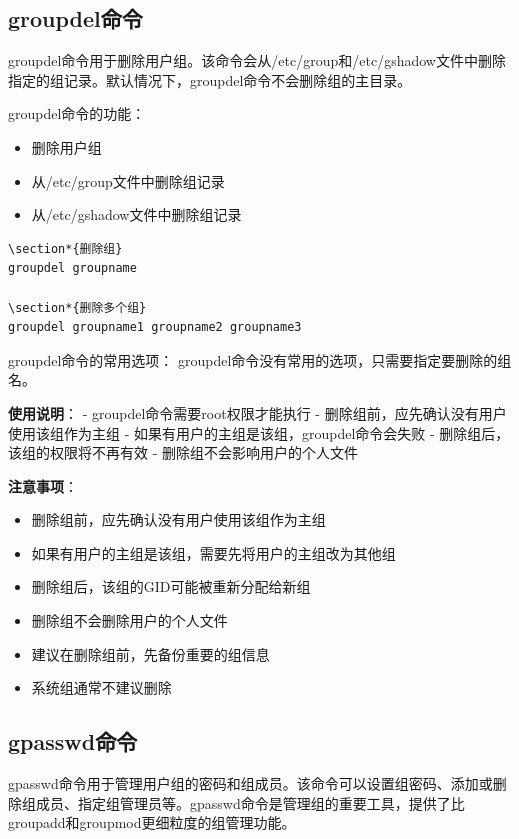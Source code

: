 \documentclass[12pt,UTF8]{ctexbook}
\begin{document}
\subsection{groupdel命令}
groupdel命令用于删除用户组。该命令会从/etc/group和/etc/gshadow文件中删除指定的组记录。默认情况下，groupdel命令不会删除组的主目录。

groupdel命令的功能：
\begin{itemize}
    \item 删除用户组
    \item 从/etc/group文件中删除组记录
    \item 从/etc/gshadow文件中删除组记录
\end{itemize}

\begin{verbatim}
\section*{删除组}
groupdel groupname

\section*{删除多个组}
groupdel groupname1 groupname2 groupname3
\end{verbatim}

groupdel命令的常用选项：
groupdel命令没有常用的选项，只需要指定要删除的组名。

\textbf{使用说明}：
- groupdel命令需要root权限才能执行
- 删除组前，应先确认没有用户使用该组作为主组
- 如果有用户的主组是该组，groupdel命令会失败
- 删除组后，该组的权限将不再有效
- 删除组不会影响用户的个人文件

\textbf{注意事项}：
\begin{itemize}
    \item 删除组前，应先确认没有用户使用该组作为主组
    \item 如果有用户的主组是该组，需要先将用户的主组改为其他组
    \item 删除组后，该组的GID可能被重新分配给新组
    \item 删除组不会删除用户的个人文件
    \item 建议在删除组前，先备份重要的组信息
    \item 系统组通常不建议删除
\end{itemize}

\subsection{gpasswd命令}
gpasswd命令用于管理用户组的密码和组成员。该命令可以设置组密码、添加或删除组成员、指定组管理员等。gpasswd命令是管理组的重要工具，提供了比groupadd和groupmod更细粒度的组管理功能。
\end{document}
